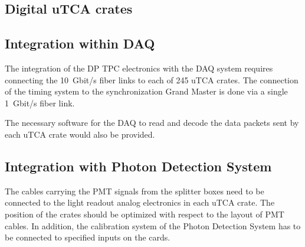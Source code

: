 \subsection{Digital uTCA crates}
\label{sec:fddp-tpc-elec-install-utca}



\subsection{Integration within DAQ}
\label{sec:fddp-tpc-elec-install-daq}
The integration of the DP TPC electronics with the DAQ system requires connecting the \SI{10}{Gbit/s} fiber links to each of \num{245} uTCA crates. The connection of the timing system to the synchronization Grand Master is done via a single \SI{1}{Gbit/s} fiber link. 

The necessary software for the DAQ to read and decode the data packets sent by each uTCA crate would also be provided.   

\subsection{Integration with Photon Detection System}
\label{sec:fddp-tpc-elec-install-pmt}
The cables carrying the PMT signals from the splitter boxes need to be connected to the light readout analog electronics in each uTCA crate. The position of the crates should be optimized with respect to the layout of PMT cables. In addition, the calibration system of the Photon Detection System has to be connected to specified inputs on the cards.



